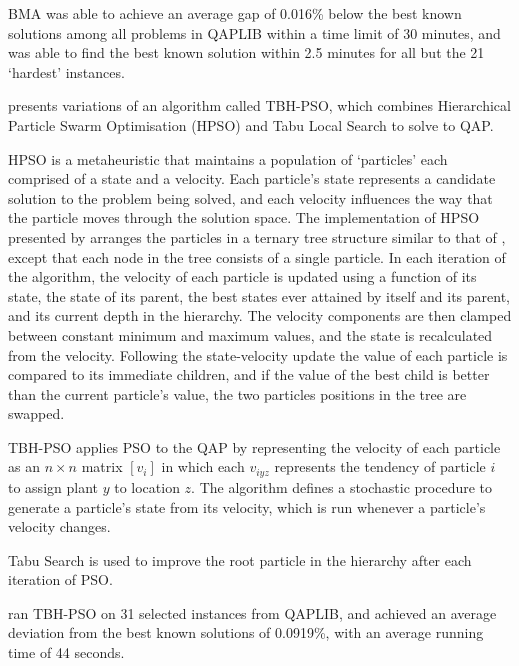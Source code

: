 {	BMA was able to achieve an average gap of 0.016\% below the best known solutions among all problems in QAPLIB within a time limit of 30 minutes, and was able to find the best known solution within 2.5 minutes for all but the 21 `hardest' instances.



	\citet{Helal:2015de} presents variations of an algorithm called TBH-PSO, which combines Hierarchical Particle Swarm Optimisation (HPSO) and Tabu Local Search to solve to QAP.

	HPSO is a metaheuristic that maintains a population of `particles' each comprised of a state and a velocity. Each particle's state represents a candidate solution to the problem being solved, and each velocity influences the way that the particle moves through the solution space.
	The implementation of HPSO presented by \citeauthor{Helal:2015de} arranges the particles in a ternary tree structure similar to that of \citet{Harris:2015kw}, except that each node in the tree consists of a single particle.
	In each iteration of the algorithm, the velocity of each particle is updated using a function of its state, the state of its parent, the best states ever attained by itself and its parent, and its current depth in the hierarchy.
	The velocity components are then clamped between constant minimum and maximum values, and the state is recalculated from the velocity.
	Following the state-velocity update the value of each particle is compared to its immediate children, and if the value of the best child is better than the current particle's value, the two particles positions in the tree are swapped.

	TBH-PSO applies PSO to the QAP by representing the velocity of each particle as an \(n \times n\) matrix \([v_{i}]\) in which each \(v_{iyz}\) represents the tendency of particle \(i\) to assign plant \(y\) to location \(z\).
	The algorithm defines a stochastic procedure to generate a particle's state from its velocity, which is run whenever a particle's velocity changes.

	Tabu Search is used to improve the root particle in the hierarchy after each iteration of PSO.

	\citeauthor{Helal:2015de} ran TBH-PSO on 31 selected instances from QAPLIB, and achieved an average deviation from the best known solutions of 0.0919\%, with an average running time of 44 seconds.
}
